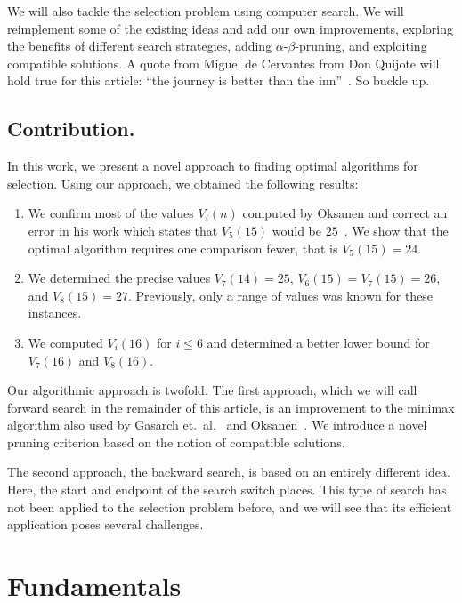 \documentclass[twoside,leqno,twocolumn]{article}
\begin{document}
We will also tackle the selection problem using computer search.
We will reimplement some of the existing ideas and add our own improvements, exploring the benefits of different search strategies, adding $\alpha$-$\beta$-pruning, and exploiting compatible solutions.
A quote from Miguel de Cervantes from Don Quijote will hold true for this article: ``the journey is better than the inn''~\cite{cervantes_don_quijote}.
So buckle up.

\subsection{Contribution.}
In this work, we present a novel approach to finding optimal algorithms for selection.
Using our approach, we obtained the following results:
\begin{enumerate}
  \item We confirm most of the values $V_i(n)$ computed by Oksanen and correct an error in his work which states that $V_5(15)$ would be $25$~\cite{Oksanen}.
        We show that the optimal algorithm requires one comparison fewer, that is $V_5(15) = 24$.
  \item We determined the precise values $V_7(14) = 25$, $V_6(15) = V_7(15) = 26$, and $V_8(15) = 27$.
        Previously, only a range of values was known for these instances.
  \item We computed $V_i(16)$ for $i \leq 6$ and determined a better lower bound for $V_7(16)$ and $V_8(16)$.
\end{enumerate}

Our algorithmic approach is twofold.
The first approach, which we will call forward search in the remainder of this article, is an improvement to the minimax algorithm also used by Gasarch et.\ al\@.~\cite{Gasarch1996} and Oksanen~\cite{Oksanen,Oksanen2006}.
We introduce a novel pruning criterion based on the notion of compatible solutions.

The second approach, the backward search, is based on an entirely different idea.
Here, the start and endpoint of the search switch places.
This type of search has not been applied to the selection problem before, and we will see that its efficient application poses several challenges.

\section{Fundamentals}
\end{document}
